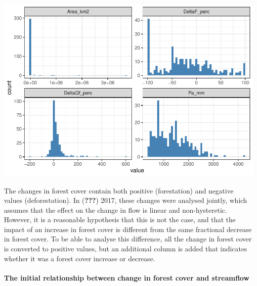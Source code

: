 \documentclass[]{elsarticle} %
\newenvironment{Shaded}{\begin{snugshade}}{\end{snugshade}}
\newcommand{\DataTypeTok}[1]{\textcolor[rgb]{0.13,0.29,0.53}{#1}}
\newcommand{\DecValTok}[1]{\textcolor[rgb]{0.00,0.00,0.81}{#1}}
\newcommand{\KeywordTok}[1]{\textcolor[rgb]{0.13,0.29,0.53}{\textbf{#1}}}
\newcommand{\NormalTok}[1]{#1}
\newcommand{\OperatorTok}[1]{\textcolor[rgb]{0.81,0.36,0.00}{\textbf{#1}}}
\newcommand{\StringTok}[1]{\textcolor[rgb]{0.31,0.60,0.02}{#1}}
\begin{document}
\includegraphics{Forest_and_Water_files/figure-latex/unnamed-chunk-4-1.pdf}

The changes in forest cover contain both positive (forestation) and
negative values (deforestation). In ({\textbf{???}}) 2017, these changes
were analysed jointly, which assumes that the effect on the change in
flow is linear and non-hysteretic. However, it is a reasonable
hypothesis that this is not the case, and that the impact of an increase
in forest cover is different from the same fractional decrease in forest
cover. To be able to analyse this difference, all the change in forest
cover is converted to positive values, but an additional column is added
that indicates whether it was a forest cover increase or decrease.

\begin{Shaded}
\end{Shaded}

\hypertarget{the-initial-relationship-between-change-in-forest-cover-and-streamflow}{%
\paragraph{The initial relationship between change in forest cover and
streamflow}\label{the-initial-relationship-between-change-in-forest-cover-and-streamflow}}
\end{document}
